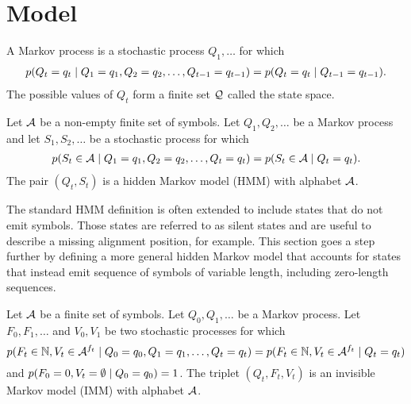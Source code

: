\section{Model}

\begin{definition}\label{def:mp}
  A Markov process is a stochastic process $Q_1, \dots$ for which
  \begin{align*}
    p(Q_t=q_t \;|\; Q_1=q_1, Q_2=q_2, \dots, Q_{t-1}=q_{t-1}) = p(Q_t=q_t \;|\; Q_{t-1}=q_{t-1}).
  \end{align*}
  The possible values of $Q_t$ form a finite set $\mathcal{Q}$ called the state space.
\end{definition}

\begin{definition}\label{def:hmm}
  Let $\mathcal{A}$ be a non-empty finite set of symbols.
  Let $Q_1, Q_2, \dots$ be a Markov process and let $S_1, S_2, \dots$
  be a stochastic process for which
  \begin{align*}
    p(S_t\in\mathcal{A} \;|\; Q_1=q_1, Q_2=q_2, \dots, Q_t=q_t) = p(S_t\in\mathcal{A} \;|\; Q_t=q_t).
  \end{align*}
  The pair $(Q_t, S_t)$ is a hidden Markov model (HMM) with alphabet $\mathcal{A}$.
\end{definition}

The standard HMM definition is often extended to include states that do not emit symbols. Those
states are referred to as silent states and are useful to describe a missing alignment position, for
example. This section goes a step further by defining a more general hidden Markov model that
accounts for states that instead emit sequence of symbols of variable length, including zero-length
sequences.


\begin{definition}
  Let $\mathcal{A}$ be a finite set of symbols.
  Let $Q_0, Q_1, \dots$ be a Markov process.
  Let $F_0, F_1, \dots$ and $V_0, V_1$ be two stochastic processes for which
  \begin{equation*}
    p(F_t\in\mathbb{N}, V_t\in\mathcal{A}^{f_t} \;|\; Q_0=q_0, Q_1=q_1, \dots, Q_t=q_t)
    = p(F_t\in\mathbb{N}, V_t\in\mathcal{A}^{f_t} \;|\; Q_t=q_t)
  \end{equation*}
  and $p(F_0=0, V_t=\emptyset \;|\; Q_0=q_0) = 1$.
  The triplet $(Q_t, F_t, V_t)$ is an invisible Markov model (IMM) with alphabet $\mathcal{A}$.
\end{definition}

